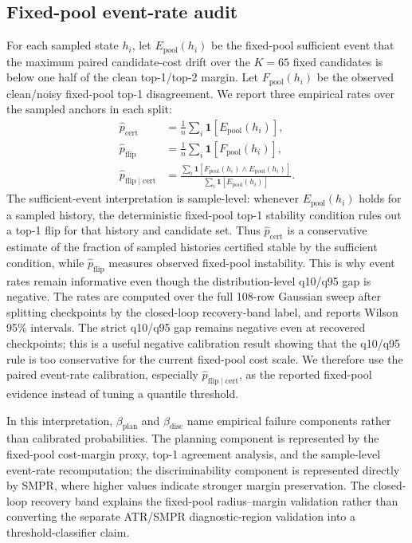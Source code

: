 \documentclass[10pt]{article}
\begin{document}
\subsection{Fixed-pool event-rate audit}\label{sec:appendix-fixed-pool-risk-calibration}

For each sampled state $h_i$, let $E_{\mathrm{pool}}(h_i)$ be the fixed-pool sufficient event that the maximum paired candidate-cost drift over the $K=65$ fixed candidates is below one half of the clean top-1/top-2 margin. Let $F_{\mathrm{pool}}(h_i)$ be the observed clean/noisy fixed-pool top-1 disagreement. We report three empirical rates over the sampled anchors in each split:
\begin{align}
\hat p_{\mathrm{cert}} &= \frac{1}{n}\sum_i \mathbf{1}[E_{\mathrm{pool}}(h_i)],\nonumber\\
\hat p_{\mathrm{flip}} &= \frac{1}{n}\sum_i \mathbf{1}[F_{\mathrm{pool}}(h_i)],\nonumber\\
\hat p_{\mathrm{flip}\mid\mathrm{cert}} &= \frac{\sum_i \mathbf{1}[F_{\mathrm{pool}}(h_i)\wedge E_{\mathrm{pool}}(h_i)]}{\sum_i \mathbf{1}[E_{\mathrm{pool}}(h_i)]}.
\end{align}
The sufficient-event interpretation is sample-level: whenever $E_{\mathrm{pool}}(h_i)$ holds for a sampled history, the deterministic fixed-pool top-1 stability condition rules out a top-1 flip for that history and candidate set. Thus $\hat p_{\mathrm{cert}}$ is a conservative estimate of the fraction of sampled histories certified stable by the sufficient condition, while $\hat p_{\mathrm{flip}}$ measures observed fixed-pool instability. This is why event rates remain informative even though the distribution-level q10/q95 gap is negative.
The rates are computed over the full 108-row Gaussian sweep after splitting checkpoints by the closed-loop recovery-band label, and  reports Wilson 95\% intervals. The strict q10/q95 gap remains negative even at recovered checkpoints; this is a useful negative calibration result showing that the q10/q95 rule is too conservative for the current fixed-pool cost scale. We therefore use the paired event-rate calibration, especially $\hat p_{\mathrm{flip}\mid\mathrm{cert}}$, as the reported fixed-pool evidence instead of tuning a quantile threshold.

In this interpretation, $\beta_{\mathrm{plan}}$ and $\beta_{\mathrm{disc}}$ name empirical failure components rather than calibrated probabilities. The planning component is represented by the fixed-pool cost-margin proxy, top-1 agreement analysis, and the sample-level event-rate recomputation; the discriminability component is represented directly by SMPR, where higher values indicate stronger margin preservation. The closed-loop recovery band explains the fixed-pool radius--margin validation rather than converting the separate ATR/SMPR diagnostic-region validation into a threshold-classifier claim.
\end{document}
